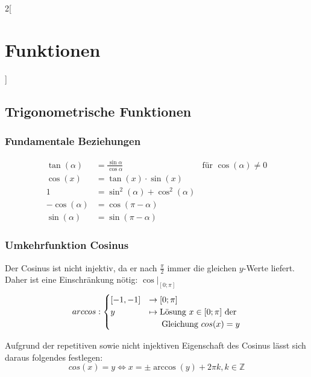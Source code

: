 \begin{multicols}{2}[
	\section{Funktionen}
]
\subsection{Trigonometrische Funktionen}
	
\subsubsection{Fundamentale Beziehungen}

	\begin{align*}
		\tan(\alpha) &= \frac{\sin \alpha}{\cos \alpha} & \text{für } \cos(\alpha) \neq 0 \\
		\cos(x) &= \tan(x) \cdot \sin(x) \\ %
		 1 &=  \sin^2(\alpha) + \cos^2(\alpha) \\
		 -\cos(\alpha) &= \cos(\pi - \alpha) \\
		 \sin(\alpha) &= \sin(\pi - \alpha)
	\end{align*}
	
\subsubsection{Umkehrfunktion Cosinus}

	Der Cosinus ist nicht injektiv, da er nach $\frac{\pi}{2}$ immer die gleichen $y$-Werte liefert. Daher ist eine Einschränkung nötig:
	$\cos|_{[0;\pi]}$
	\[
		arccos : \begin{cases}
			[-1, -1] &\to [0;\pi]\\
			y &\mapsto \text{Lösung } x \in [0;\pi] \text{ der}\\
			  &\indent \text{Gleichung }  cos(x) = y
		\end{cases}
	\]
	
	Aufgrund der repetitiven sowie nicht injektiven Eigenschaft des Cosinus lässt sich daraus folgendes festlegen:
	\[
		cos(x) = y \iff x = \pm \arccos(y) + 2 \pi k, k \in \mathbb{Z}
	\]
	
	
\end{multicols}


